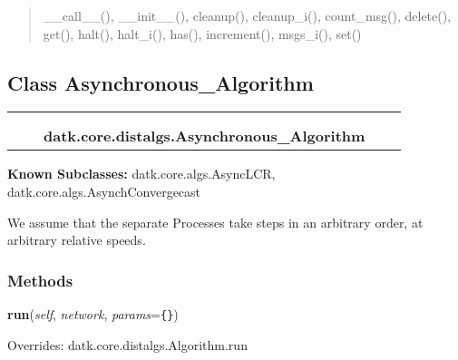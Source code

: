 \begin{quote}
\_\_call\_\_(), \_\_init\_\_(), cleanup(), cleanup\_i(), count\_msg(), delete(), get(), halt(), halt\_i(), has(), increment(), msgs\_i(), set()
\end{quote}


\subsection{Class Asynchronous\_Algorithm}

    \label{datk:core:distalgs:Asynchronous_Algorithm}
\begin{tabular}{cccccc}
\multicolumn{2}{r}{\settowidth{\BCL}{datk.core.distalgs.Algorithm}\multirow{2}{\BCL}{datk.core.distalgs.Algorithm}}
&&
  \\\cline{3-3}
  &&\multicolumn{1}{c|}{}
&&
  \\
&&\multicolumn{2}{l}{\textbf{datk.core.distalgs.Asynchronous\_Algorithm}}
\end{tabular}

\textbf{Known Subclasses:}
datk.core.algs.AsyncLCR,
    datk.core.algs.AsynchConvergecast

We assume that the separate Processes take steps in an arbitrary order, at 
arbitrary relative speeds.



  \subsubsection{Methods}

    \vspace{0.5ex}

\hspace{.8\funcindent}\begin{boxedminipage}{\funcwidth}

    \raggedright \textbf{run}(\textit{self}, \textit{network}, \textit{params}={\tt \texttt{\{}\texttt{\}}})

\setlength{\parskip}{2ex}
\setlength{\parskip}{1ex}
      Overrides: datk.core.distalgs.Algorithm.run

    \end{boxedminipage}

